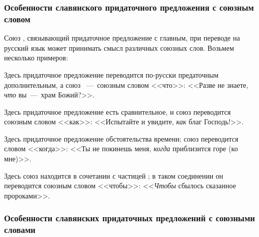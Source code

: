 \documentclass[11pt,a4paper,oneside]{memoir}
\begin{document}
    \bigskip{}

                \subsubsection[Особенности славянского придаточного предложения]{Особенности славянского придаточного предложения с союзным словом {}}

    Союз {}, связывающий придаточное предложение с главным, при переводе на русский язык может принимать смысл различных союзных слов. Возьмем несколько примеров:
    
    \bigskip{}

    Здесь придаточное предложение переводится по-русски предаточным дополнительным, а союз {}~---~союзным словом <<что>>: <<Разве не знаете, \emph{что} вы~---~храм Божий?>>.
    
    \bigskip{}
    
    Здесь придаточное предложение есть сравнительное, и союз {} переводится союзным словом <<как>>: <<Испытайте и увидите, \emph{как} благ Господь!>>.
    
    \bigskip{}
    
    Здесь придаточное предложение обстоятельства времени; союз {} переводится словом <<когда>>: <<Ты не покинешь меня, \emph{когда} приблизится горе (ко мне)>>.
    
    \bigskip{}

    Здесь союз {} находится в сочетании с частицей {}; в таком соединении он переводится союзным словом <<чтобы>>: <<\emph{Чтобы} сбылось сказанное пророками>>.

                \subsubsection{Особенности славянских придаточных предложений с союзными словами {}}
\end{document}
